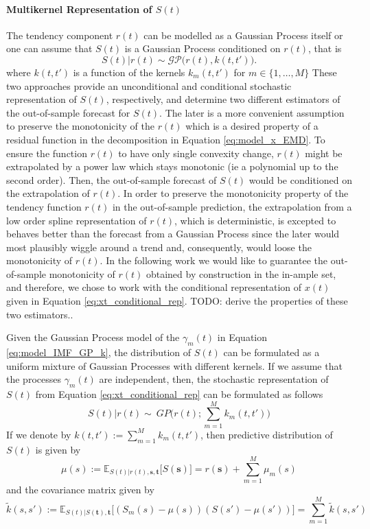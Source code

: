 \paragraph{Multikernel Representation of $S(t)$}
The tendency component $r(t)$ can be modelled as a Gaussian Process itself or one can assume that $S(t)$ is a Gaussian Process conditioned on $r(t)$, that is
\begin{equation}\label{eq:xt_conditional_rep}
S(t) | r(t) \sim \mathcal{GP} \Big(r(t),  k(t,t')  \Big).
\end{equation}
where $k(t,t')$ is a function of the kernels $k_m(t,t')$ for $m \in \big\{1,\ldots,M \big\}$
These two approaches provide an unconditional and conditional stochastic representation of $S(t)$, respectively, and determine two different estimators of the out-of-sample forecast for $S(t)$.  The later is a more convenient assumption to preserve the monotonicity of the $r(t)$ which is a desired property of a residual function in the decomposition in Equation \eqref{eq:model_x_EMD}.  To ensure the function $r(t)$ to have only single convexity change, $r(t)$ might be extrapolated by a power law which stays monotonic (ie a polynomial up to the second order). Then, the out-of-sample forecast of $S(t)$ would be conditioned on the extrapolation of $r(t)$.  In order to preserve the monotonicity property of the tendency function $r(t)$ in the out-of-sample prediction, the extrapolation from a low order spline representation of $r(t)$, which is deterministic,  is excepted to behaves better than the forecast from a Gaussian Process since the later would most plausibly wiggle around a trend and, consequently, would loose the monotonicity of $r(t)$.  In the following work we would like to guarantee the out-of-sample monotonicity of $r(t)$ obtained by construction in the in-ample set,  and therefore, we chose to work with the conditional representation of $x(t)$ given in Equation \eqref{eq:xt_conditional_rep}.  {\color{red} TODO: derive the properties of these two estimators.}.


Given the Gaussian Process model of the $\gamma_m(t)$ in Equation \eqref{eq:model_IMF_GP_k}, the distribution of $S(t)$ can be formulated as a uniform mixture of Gaussian Processes with different kernels.  If we assume that the processes $\gamma_m(t)$ are independent, then, the stochastic representation of $S(t)$ from Equation \eqref{eq:xt_conditional_rep} can be formulated as follows
\begin{equation}
S(t)|r(t) \sim ~   GP \bigg(r(t); \sum_{m=1}^M k_m(t,t') \bigg) 
\end{equation}
If we denote by $k(t,t') := \sum_{m=1}^M k_m(t,t')$, then predictive distribution of $S(t)$ is given by 
\begin{equation}
\mu(s):= \mathbb{E}_{S(t)| r(t), \mathbf{s},\mathbf{t}} \big[S(\mathbf{s})] =  r(\mathbf{s}) + \sum_{m = 1}^M \mu_m(s)
\end{equation}
and the covariance matrix given by
\begin{equation}
\tilde{k}(s,s'):= \mathbb{E}_{S(t)|S(\mathbf{t}), \mathbf{t}} \bigg[(S_m(s) - \mu(s))(S(s') - \mu(s'))\bigg] = \sum_{m = 1}^M \tilde{k}(s,s') 
\end{equation}


